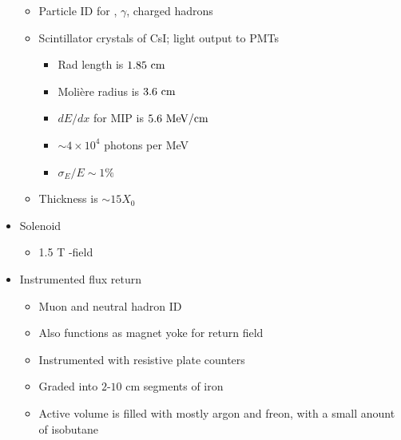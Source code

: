 \begin{itemize}
  \begin{itemize}
    \item Particle ID for \el, $\gamma$, charged hadrons
    \item Scintillator crystals of CsI; light output to PMTs
    \begin{itemize}
      \item Rad length is $1.85~\text{cm}$
      \item Moli\`ere radius is $3.6~\text{cm}$
      \item $dE/dx$ for MIP is $5.6~\text{MeV}/\text{cm}$
      \item $\sim 4 \times 10^4$ photons per MeV
      \item $\sigma_E/E \sim 1\%$
    \end{itemize}
    \item Thickness is $\sim 15 X_0$
  \end{itemize}
  \item Solenoid
  \begin{itemize}
    \item 1.5 T \B-field
  \end{itemize}
  \item Instrumented flux return
  \begin{itemize}
    \item Muon and neutral hadron ID
    \item Also functions as magnet yoke for return field
    \item Instrumented with resistive plate counters
    \item Graded into $2$-$10$ cm segments of iron
    \item Active volume is filled with mostly argon and freon, with a small anount of isobutane
  \end{itemize}
\end{itemize}

